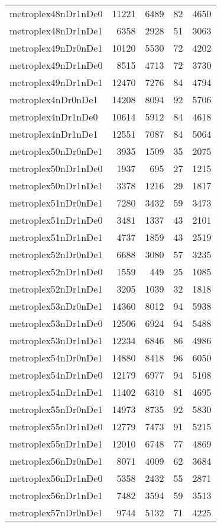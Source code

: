 \begin{longtable}{lrrrr}
metroplex48nDr1nDe0 & 11221 & 6489 & 82 & 4650 \\
metroplex48nDr1nDe1 & 6358 & 2928 & 51 & 3063 \\
metroplex49nDr0nDe1 & 10120 & 5530 & 72 & 4202 \\
metroplex49nDr1nDe0 & 8515 & 4713 & 72 & 3730 \\
metroplex49nDr1nDe1 & 12470 & 7276 & 84 & 4794 \\
metroplex4nDr0nDe1 & 14208 & 8094 & 92 & 5706 \\
metroplex4nDr1nDe0 & 10614 & 5912 & 84 & 4618 \\
metroplex4nDr1nDe1 & 12551 & 7087 & 84 & 5064 \\
metroplex50nDr0nDe1 & 3935 & 1509 & 35 & 2075 \\
metroplex50nDr1nDe0 & 1937 & 695 & 27 & 1215 \\
metroplex50nDr1nDe1 & 3378 & 1216 & 29 & 1817 \\
metroplex51nDr0nDe1 & 7280 & 3432 & 59 & 3473 \\
metroplex51nDr1nDe0 & 3481 & 1337 & 43 & 2101 \\
metroplex51nDr1nDe1 & 4737 & 1859 & 43 & 2519 \\
metroplex52nDr0nDe1 & 6688 & 3080 & 57 & 3235 \\
metroplex52nDr1nDe0 & 1559 & 449 & 25 & 1085 \\
metroplex52nDr1nDe1 & 3205 & 1039 & 32 & 1818 \\
metroplex53nDr0nDe1 & 14360 & 8012 & 94 & 5938 \\
metroplex53nDr1nDe0 & 12506 & 6924 & 94 & 5488 \\
metroplex53nDr1nDe1 & 12234 & 6846 & 86 & 4986 \\
metroplex54nDr0nDe1 & 14880 & 8418 & 96 & 6050 \\
metroplex54nDr1nDe0 & 12179 & 6977 & 94 & 5108 \\
metroplex54nDr1nDe1 & 11402 & 6310 & 81 & 4695 \\
metroplex55nDr0nDe1 & 14973 & 8735 & 92 & 5830 \\
metroplex55nDr1nDe0 & 12779 & 7473 & 91 & 5215 \\
metroplex55nDr1nDe1 & 12010 & 6748 & 77 & 4869 \\
metroplex56nDr0nDe1 & 8071 & 4009 & 62 & 3684 \\
metroplex56nDr1nDe0 & 5358 & 2432 & 55 & 2871 \\
metroplex56nDr1nDe1 & 7482 & 3594 & 59 & 3513 \\
metroplex57nDr0nDe1 & 9744 & 5132 & 71 & 4225 \\

\end{longtable}

